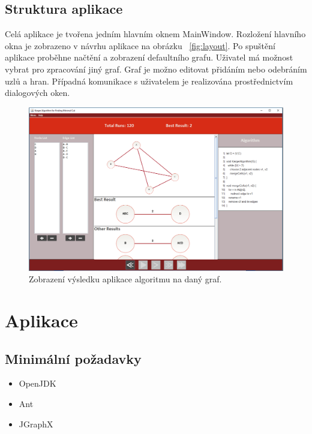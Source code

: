 \documentclass[../projekt.tex]{subfiles}
\begin{document}
\subsection{Struktura aplikace}

Celá aplikace je tvořena jedním hlavním oknem MainWindow. Rozložení hlavního okna je zobrazeno v návrhu aplikace na obrázku ~\ref{fig:layout}. Po spuštění aplikace proběhne načtění a zobrazení defaultního grafu. Uživatel má možnost vybrat pro zpracování jiný graf. Graf je možno editovat přidáním nebo odebráním uzlů a hran. Případná komunikace s uživatelem je realizována prostřednictvím dialogových oken. 


	\begin{figure}[ht]
    	\begin{center}
  			\includegraphics[scale=0.4]{obrazky-figures/finish.png}
  			\caption{Zobrazení výsledku aplikace algoritmu na daný graf.}
  		\end{center}
	\end{figure}



\newpage
\section{Aplikace}

\subsection{Minimální požadavky}

\begin{itemize}
	\item OpenJDK
	\item Ant 
	\item JGraphX
\end{itemize}
\end{document}
